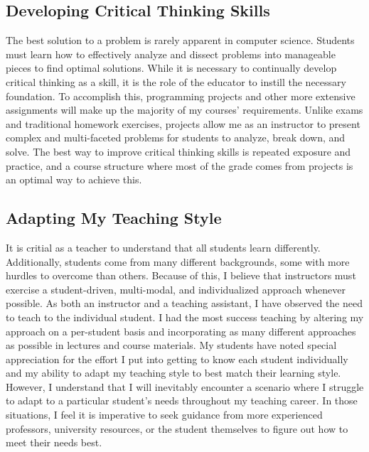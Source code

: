 \subsection*{Developing Critical Thinking Skills}
\vspace{-0.5cm}
The best solution to a problem is rarely apparent in computer science. Students must learn how to effectively analyze and dissect problems into manageable pieces to find optimal solutions. While it is necessary to continually develop critical thinking as a skill, it is the role of the educator to instill the necessary foundation. To accomplish this, programming projects and other more extensive assignments will make up the majority of my courses’ requirements. Unlike exams and traditional homework exercises, projects allow me as an instructor to present complex and multi-faceted problems for students to analyze, break down, and solve. The best way to improve critical thinking skills is repeated exposure and practice, and a course structure where most of the grade comes from projects is an optimal way to achieve this.

\subsection*{Adapting My Teaching Style}
\vspace{-0.5cm}
It is critial as a teacher to understand that all students learn differently. Additionally, students come from many different backgrounds, some with more hurdles to overcome than others. Because of this, I believe that instructors must exercise a student-driven, multi-modal, and individualized approach whenever possible. As both an instructor and a teaching assistant, I have observed the need to teach to the individual student. I had the most success teaching by altering my approach on a per-student basis and incorporating as many different approaches as possible in lectures and course materials. My students have noted special appreciation for the effort I put into getting to know each student individually and my ability to adapt my teaching style to best match their learning style. However, I understand that I will inevitably encounter a scenario where I struggle to adapt to a particular student's needs throughout my teaching career. In those situations, I feel it is imperative to seek guidance from more experienced professors, university resources, or the student themselves to figure out how to meet their needs best.

